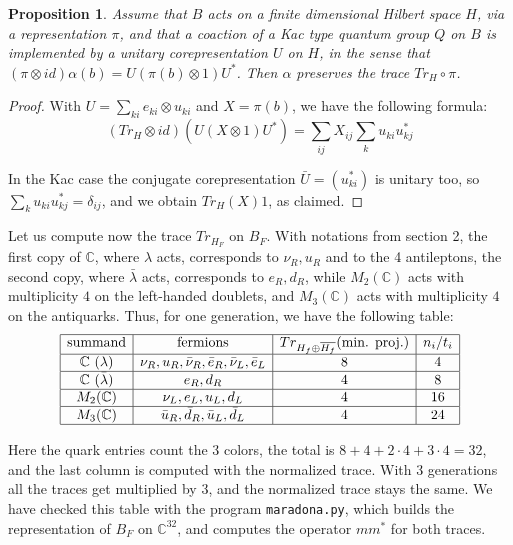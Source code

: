 \documentclass[11pt]{amsart}
\newtheorem{proposition}[theorem]{Proposition}
\theoremstyle{definition}
\begin{document}
\begin{proposition}
Assume that $B$ acts on a finite dimensional Hilbert space $H$, via a representation $\pi$, and that a coaction of a Kac type quantum group $Q$ on $B$ is implemented by a unitary corepresentation $U$ on $H$, in the sense that $(\pi\otimes id)\alpha(b)=U(\pi(b)\otimes1)U^*$. Then $\alpha$ preserves the trace $Tr_H\circ\pi$.
\end{proposition}

\begin{proof}
With $U=\sum_{ki}e_{ki}\otimes u_{ki}$ and $X=\pi(b)$, we have the following formula:
$$(Tr_H\otimes id)(U(X\otimes1)U^*)=\sum_{ij}X_{ij}\sum_ku_{ki}u_{kj}^*$$

In the Kac case the conjugate corepresentation $\bar{U}=(u_{ki}^*)$ is unitary too, so $\sum_ku_{ki}u_{kj}^*=\delta_{ij}$, and we obtain $Tr_H(X)1$, as claimed.
\end{proof}

Let us compute now the trace $Tr_{H_F}$ on $B_F$. With notations from section 2, the first copy of $\mathbb C$, where $\lambda$ acts, corresponds to $\nu_R,u_R$ and to the 4 antileptons, the second copy, where $\bar{\lambda}$ acts, corresponds to $e_R,d_R$, while $M_2(\mathbb C)$ acts with multiplicity $4$ on the left-handed doublets, and $M_3(\mathbb C)$ acts with multiplicity $4$ on the antiquarks. Thus, for one generation, we have the following table:
$$\begin{array}{|c|c|c|c|}
\hline
\text{summand}&\text{fermions}&Tr_{H_f\oplus\overline{H_f}}(\text{min. proj.})&n_i/t_i\\
\hline
\mathbb C\ (\lambda)&\nu_R,u_R,\bar{\nu}_R,\bar{e}_R,\bar{\nu}_L,\bar{e}_L&8&4\\
\hline
\mathbb C\ (\bar{\lambda})&e_R,d_R&4&8\\
\hline
M_2(\mathbb C)&\nu_L,e_L,u_L,d_L&4&16\\
\hline
M_3(\mathbb C)&\bar{u}_R,\bar{d}_R,\bar{u}_L,\bar{d}_L&4&24\\
\hline
\end{array}$$

Here the quark entries count the 3 colors, the total is $8+4+2\cdot4+3\cdot4=32$, and the last column is computed with the normalized trace. With 3 generations all the traces get multiplied by $3$, and the normalized trace stays the same. We have checked this table with the program {\tt maradona.py}, which builds the representation of $B_F$ on $\mathbb C^{32}$, and computes the operator $mm^*$ for both traces.
\end{document}
